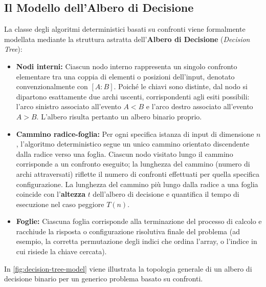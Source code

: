\subsection{Il Modello dell'Albero di Decisione}
\label{subsec:decision-tree-model}

La classe degli algoritmi deterministici basati su confronti viene formalmente modellata mediante la struttura astratta dell'\textbf{Albero di Decisione} (\textit{Decision Tree}):

\begin{itemize}
  \item \textbf{Nodi interni:} Ciascun nodo interno rappresenta un singolo confronto elementare tra una coppia di elementi o posizioni dell'input, denotato convenzionalmente con $[A : B]$. Poiché le chiavi sono distinte, dal nodo si dipartono esattamente due archi uscenti, corrispondenti agli esiti possibili: l'arco sinistro associato all'evento $A < B$ e l'arco destro associato all'evento $A > B$. L'albero risulta pertanto un albero binario proprio.
  \item \textbf{Cammino radice-foglia:} Per ogni specifica istanza di input di dimensione $n$, l'algoritmo deterministico segue un unico cammino orientato discendente dalla radice verso una foglia. Ciascun nodo visitato lungo il cammino corrisponde a un confronto eseguito; la lunghezza del cammino (numero di archi attraversati) riflette il numero di confronti effettuati per quella specifica configurazione. La lunghezza del cammino più lungo dalla radice a una foglia coincide con l'\textbf{altezza} $t$ dell'albero di decisione e quantifica il tempo di esecuzione nel caso peggiore $T(n)$.
  \item \textbf{Foglie:} Ciascuna foglia corrisponde alla terminazione del processo di calcolo e racchiude la risposta o configurazione risolutiva finale del problema (ad esempio, la corretta permutazione degli indici che ordina l'array, o l'indice in cui risiede la chiave cercata).
\end{itemize}

In \autoref{fig:decision-tree-model} viene illustrata la topologia generale di un albero di decisione binario per un generico problema basato su confronti.

